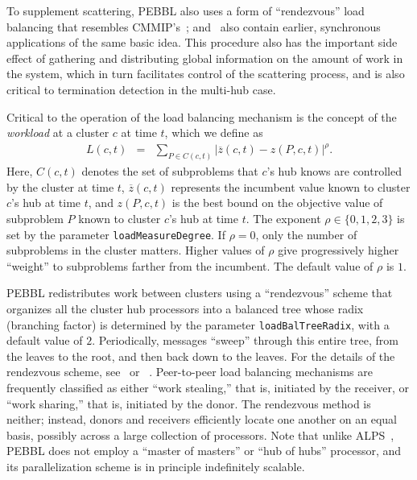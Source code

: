 To supplement scattering, PEBBL also uses a form of ``rendezvous''
load balancing that resembles CMMIP's~\cite{Eck97};
\cite{MD93} and~\cite{KK92} also contain earlier, synchronous
applications of the same basic idea.  This procedure also has the
important side effect of gathering and distributing global information
on the amount of work in the system, which in turn facilitates control
of the scattering process, and is also critical to termination
detection in the multi-hub case.

Critical to the operation of the load balancing mechanism is the
concept of the \emph{workload} at a cluster $c$ at time $t$, which we
define as
\begin{eqnarray}
L(c,t) & = &\sum_{P \in C(c,t)} \!\!\!
{ \left| \overline{z}(c,t) - z(P,c,t) \right| }^{\rho}.
\label{loadcalc}
\end{eqnarray}
Here, $C(c,t)$ denotes the set of subproblems that $c$'s hub knows are
controlled by the cluster at time $t$, $\overline{z}(c,t)$ represents the
incumbent value known to cluster $c$'s hub at time $t$, and $z(P,c,t)$
is the best bound on the objective value of subproblem $P$ known to cluster
$c$'s hub at time $t$.  The exponent $\rho \in \{0, 1, 2, 3\}$
is set by the parameter \texttt{loadMeasureDegree}.  If $\rho=0$,
only the number of subproblems in the cluster matters.  Higher values of
$\rho$ give progressively higher ``weight'' to subproblems
farther from the incumbent.  The default value of $\rho$ is $1$.

PEBBL redistributes work between clusters using a ``rendezvous''
scheme that organizes all the cluster hub processors into a balanced
tree whose radix (branching factor) is determined by the parameter
\texttt{loadBalTreeRadix}, with a default value of $2$.  Periodically,
messages ``sweep'' through this entire tree, from the leaves to the
root, and then back down to the leaves.  For the details of the
rendezvous scheme, see~\cite[Section 4.4]{EPH00} or ~\cite[Section
4.3]{EPH00a}.  Peer-to-peer load balancing mechanisms are frequently
classified as either ``work stealing,'' that is, initiated by the
receiver, or ``work sharing,'' that is, initiated by the donor.  The
rendezvous method is neither; instead, donors and receivers
efficiently locate one another on an equal basis, possibly across a
large collection of processors.  Note that unlike ALPS~\cite{RLS04},
PEBBL does not employ a ``master of masters'' or ``hub of hubs''
processor, and its parallelization scheme is in principle indefinitely
scalable. 

